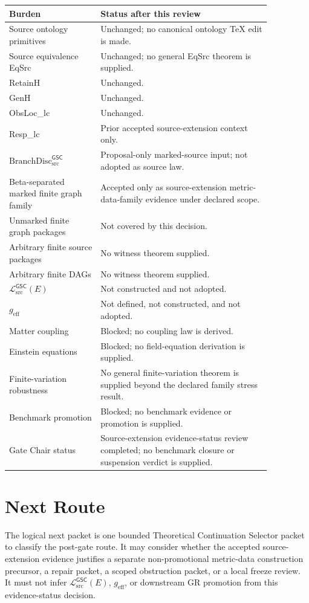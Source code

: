 \documentclass[11pt]{article}
\newcommand{\BranchDisc}{\mathrm{BranchDisc}_{\mathrm{src}}^{\mathsf{GSC}}}
\newcommand{\MetricData}{\mathcal{L}_{\mathrm{src}}^{\mathsf{GSC}}}
\newcommand{\geff}{g_{\mathrm{eff}}}
\begin{document}
\begin{longtable}{p{0.30\linewidth}p{0.56\linewidth}}
\toprule
Burden & Status after this review \\
\midrule
Source ontology primitives & Unchanged; no canonical ontology TeX edit is made. \\
Source equivalence EqSrc & Unchanged; no general EqSrc theorem is supplied. \\
RetainH & Unchanged. \\
GenH & Unchanged. \\
ObsLoc\_lc & Unchanged. \\
Resp\_lc & Prior accepted source-extension context only. \\
\(\BranchDisc\) & Proposal-only marked-source input; not adopted as source law. \\
Beta-separated marked finite graph family & Accepted only as source-extension metric-data-family evidence under declared scope. \\
Unmarked finite graph packages & Not covered by this decision. \\
Arbitrary finite source packages & No witness theorem supplied. \\
Arbitrary finite DAGs & No witness theorem supplied. \\
\(\MetricData(E)\) & Not constructed and not adopted. \\
\(\geff\) & Not defined, not constructed, and not adopted. \\
Matter coupling & Blocked; no coupling law is derived. \\
Einstein equations & Blocked; no field-equation derivation is supplied. \\
Finite-variation robustness & No general finite-variation theorem is supplied beyond the declared family stress result. \\
Benchmark promotion & Blocked; no benchmark evidence or promotion is supplied. \\
Gate Chair status & Source-extension evidence-status review completed; no benchmark closure or suspension verdict is supplied. \\
\bottomrule
\end{longtable}

\section{Next Route}

The logical next packet is one bounded Theoretical Continuation Selector
packet to classify the post-gate route. It may consider whether the accepted
source-extension evidence justifies a separate non-promotional metric-data
construction precursor, a repair packet, a scoped obstruction packet, or a
local freeze review. It must not infer \(\MetricData(E)\), \(\geff\), or
downstream GR promotion from this evidence-status decision.
\end{document}

